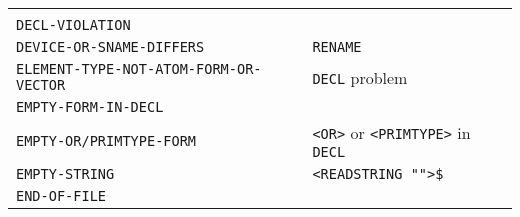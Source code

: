 \documentclass[a4paper,]{article}
\begin{document}
\begin{longtable}[]{@{}ll@{}}
\begin{minipage}[t]{0.36\columnwidth}
\strut
\end{minipage}\tabularnewline
\begin{minipage}[t]{0.58\columnwidth}\raggedright\strut
\texttt{DECL-VIOLATION}\strut
\end{minipage} & \begin{minipage}[t]{0.36\columnwidth}\raggedright\strut
\strut
\end{minipage}\tabularnewline
\begin{minipage}[t]{0.58\columnwidth}\raggedright\strut
\texttt{DEVICE-OR-SNAME-DIFFERS}\strut
\end{minipage} & \begin{minipage}[t]{0.36\columnwidth}\raggedright\strut
\texttt{RENAME}\strut
\end{minipage}\tabularnewline
\begin{minipage}[t]{0.58\columnwidth}\raggedright\strut
\texttt{ELEMENT-TYPE-NOT-ATOM-FORM-OR-VECTOR}\strut
\end{minipage} & \begin{minipage}[t]{0.36\columnwidth}\raggedright\strut
\texttt{DECL} problem\strut
\end{minipage}\tabularnewline
\begin{minipage}[t]{0.58\columnwidth}\raggedright\strut
\texttt{EMPTY-FORM-IN-DECL}\strut
\end{minipage} & \begin{minipage}[t]{0.36\columnwidth}\raggedright\strut
\strut
\end{minipage}\tabularnewline
\begin{minipage}[t]{0.58\columnwidth}\raggedright\strut
\texttt{EMPTY-OR/PRIMTYPE-FORM}\strut
\end{minipage} & \begin{minipage}[t]{0.36\columnwidth}\raggedright\strut
\texttt{\textless{}OR\textgreater{}} or \texttt{\textless{}PRIMTYPE\textgreater{}} in \texttt{DECL}\strut
\end{minipage}\tabularnewline
\begin{minipage}[t]{0.58\columnwidth}\raggedright\strut
\texttt{EMPTY-STRING}\strut
\end{minipage} & \begin{minipage}[t]{0.36\columnwidth}\raggedright\strut
\texttt{\textless{}READSTRING\ ""\textgreater{}\$}\strut
\end{minipage}\tabularnewline
\begin{minipage}[t]{0.58\columnwidth}\raggedright\strut
\texttt{END-OF-FILE}\strut
\end{minipage} & \begin{minipage}[t]{0.36\columnwidth}\raggedright\strut

\end{minipage}
\end{longtable}
\end{document}
